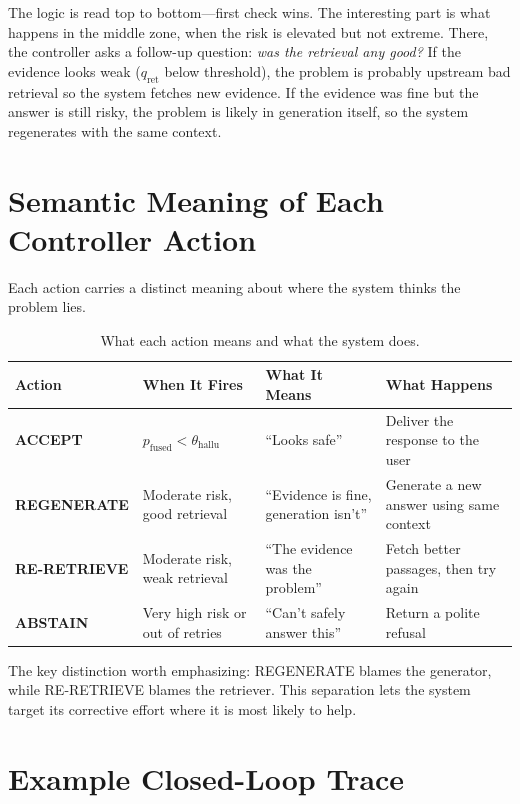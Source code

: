 The logic is read top to bottom—first check wins. The interesting part is what happens in the middle zone, when the risk is elevated but not extreme. There, the controller asks a follow-up question: \emph{was the retrieval any good?} If the evidence looks weak ($q_{\text{ret}}$ below threshold), the problem is probably upstream bad retrieval so the system fetches new evidence. If the evidence was fine but the answer is still risky, the problem is likely in generation itself, so the system regenerates with the same context.

\section{Semantic Meaning of Each Controller Action}
\label{sec:action_semantics}

Each action carries a distinct meaning about where the system thinks the problem lies.

\begin{table}[!htb]
\centering
\caption{What each action means and what the system does.}
\label{tab:action_semantics}
\small
\begin{tabular}{@{}l p{3cm} p{4cm} p{4cm}@{}}
\toprule
\textbf{Action} & \textbf{When It Fires} & \textbf{What It Means} & \textbf{What Happens} \\
\midrule
\textbf{ACCEPT} & $p_{\text{fused}} < \theta_{\text{hallu}}$ & ``Looks safe'' & Deliver the response to the user \\[4pt]
\textbf{REGENERATE} & Moderate risk, good retrieval & ``Evidence is fine, generation isn't'' & Generate a new answer using same context \\[4pt]
\textbf{RE-RETRIEVE} & Moderate risk, weak retrieval & ``The evidence was the problem'' & Fetch better passages, then try again \\[4pt]
\textbf{ABSTAIN} & Very high risk or out of retries & ``Can't safely answer this'' & Return a polite refusal \\
\bottomrule
\end{tabular}
\end{table}

The key distinction worth emphasizing: REGENERATE blames the generator, while RE-RETRIEVE blames the retriever. This separation lets the system target its corrective effort where it is most likely to help.

\section{Example Closed-Loop Trace}
\label{sec:trace_ch7}

